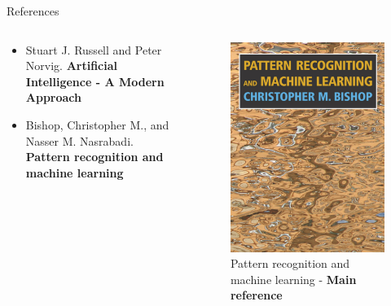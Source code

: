 \begin{frame}{References}
    \begin{columns}
        \begin{column}{0.5\textwidth}
            \begin{itemize}
                \item Stuart J. Russell and Peter Norvig. \textbf{Artificial Intelligence - A Modern Approach}
                \item Bishop, Christopher M., and Nasser M. Nasrabadi. \textbf{Pattern recognition and machine learning}
            \end{itemize}
        \end{column}

        \begin{column}{0.5\textwidth}
            \begin{figure}
                \includegraphics[width=0.6\linewidth]{img/pattern.png}
                \caption{Pattern recognition and machine learning - \textbf{Main reference}}
            \end{figure}
        \end{column}
    \end{columns}
\end{frame}

